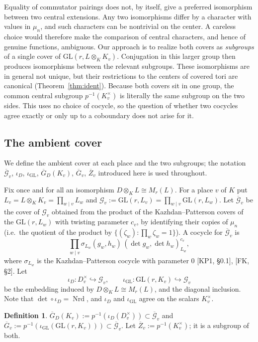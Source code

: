 \documentclass[12pt]{article}
\newcommand{\ov}[1]{\overline{#1}}
\newcommand{\Nrd}{\operatorname{Nrd}}
\newcommand{\GL}{\mathrm{GL}}
\newcommand{\Gb}{\ov{G}}
\newcommand{\Zb}{\ov{Z}}
\newcommand{\GDb}{\ov{G}_D}
\newcommand{\cG}{\mathcal{G}}
\newcommand{\cGb}{\ov{\mathcal{G}}}
\newcommand{\iD}{\iota_D}
\newcommand{\iG}{\iota_{\GL}}
\theoremstyle{plain}
\theoremstyle{definition}
\newtheorem{definition}[theorem]{Definition}
\begin{document}
Equality of commutator pairings does not, by itself, give a preferred isomorphism between two central extensions. Any two isomorphisms differ by a character with values in $\mu_n$, and such characters can be nontrivial on the center. A careless choice would therefore make the comparison of central characters, and hence of genuine functions, ambiguous. Our approach is to realize both covers as \emph{subgroups} of a single cover of $\GL(r,L\otimes_KK_v)$. Conjugation in this larger group then produces isomorphisms between the relevant subgroups. These isomorphisms are in general not unique, but their restrictions to the centers of covered tori are canonical (Theorem~\ref{thm:ident}). Because both covers sit in one group, the common central subgroup $p^{-1}(K_v^\times)$ is literally the same subgroup on the two sides. This uses no choice of cocycle, so the question of whether two cocycles agree exactly or only up to a coboundary does not arise for it.

\subsection{The ambient cover}\label{subsec:ambient}
We define the ambient cover at each place and the two subgroups; the notation $\cGb_v$, $\iD$, $\iG$, $\GDb(K_v)$, $\Gb_v$, $\Zb_v$ introduced here is used throughout.

Fix once and for all an isomorphism $D\otimes_KL\cong M_r(L)$. For a place $v$ of $K$ put $L_v=L\otimes_KK_v=\prod_{w\mid v}L_w$ and $\cG_v:=\GL(r,L_v)=\prod_{w\mid v}\GL(r,L_w)$. Let $\cGb_v$ be the cover of $\cG_v$ obtained from the product of the Kazhdan--Patterson covers of the $\GL(r,L_w)$ with twisting parameter $c_v$, by identifying their copies of $\mu_n$ (i.e.\ the quotient of the product by $\{(\zeta_w):\prod_w\zeta_w=1\}$). A cocycle for $\cGb_v$ is
\begin{equation}\label{eq:ambient}
\prod_{w\mid v}\sigma_{L_w}(g_w,h_w)\,(\det g_w,\det h_w)_{L_w}^{c_v},
\end{equation}
where $\sigma_{L_w}$ is the Kazhdan--Patterson cocycle with parameter $0$ [KP1, \S0.1], [FK, \S2]. Let
\[ \iD:D_v^\times\hookrightarrow\cG_v,\qquad \iG:\GL(r,K_v)\hookrightarrow\cG_v \]
be the embedding induced by $D\otimes_KL\cong M_r(L)$, and the diagonal inclusion. Note that $\det\circ\iD=\Nrd$, and $\iD$ and $\iG$ agree on the scalars $K_v^\times$.

\begin{definition}\label{def:localcovers}
$\GDb(K_v):=p^{-1}(\iD(D_v^\times))\subset\cGb_v$ and $\Gb_v:=p^{-1}(\iG(\GL(r,K_v)))\subset\cGb_v$. Let $\Zb_v:=p^{-1}(K_v^\times)$; it is a subgroup of both.
\end{definition}
\end{document}
